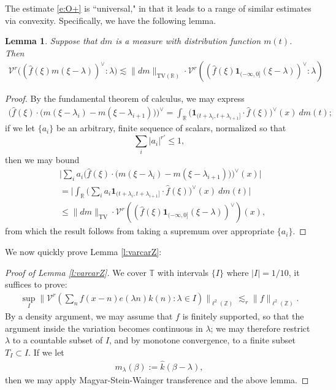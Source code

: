 \documentclass[12pt]{amsart}
\numberwithin{equation}{section}
\newtheorem{lemma}[theorem]{Lemma}
\theoremstyle{definition}
\begin{document}
The estimate \eqref{e:O+} is ``universal," in that it leads to a range of similar estimates via convexity. Specifically, we have the following lemma.
\begin{lemma}\label{l:varcar}
    Suppose that $dm$ is a measure with distribution function $m(t)$. Then
    \begin{align}
        \mathcal{V}^r\big((\widehat{f}(\xi) m(\xi - \lambda) )^{\vee} : \lambda \big) \lesssim \| dm \|_{\text{TV}(\mathbb{R})} \cdot
        \mathcal{V}^r( (\widehat{f}(\xi) \mathbf{1}_{(-\infty,0]}(\xi - \lambda) )^{\vee} : \lambda) 
    \end{align}
\end{lemma}
\begin{proof}
By the fundamental theorem of calculus, we may express
\begin{align}
    \Big( \widehat{f}(\xi) \cdot \big( m(\xi - \lambda_i)  - m(\xi - \lambda_{i+1}) \big) \Big)^{\vee} = \int_{\mathbb{R}} \big( \mathbf{1}_{(t+\lambda_i,t+\lambda_{i+1}]} \cdot \widehat{f}(\xi) \big)^{\vee}(x)  \ dm(t);
\end{align}
if we let $\{ a_i \}$ be an arbitrary, finite sequence of scalars, normalized so that 
\[ \sum_i |a_i|^{r'} \leq 1,\]
then we may bound
\begin{align}
    &\Big| \sum_i a_i \Big( \widehat{f}(\xi) \cdot \big( m(\xi - \lambda_i)  - m(\xi - \lambda_{i+1}) \big) \Big)^{\vee}(x) \Big| \\
    & = \Big| \int_{\mathbb{R}} \big( \sum_i a_i \mathbf{1}_{(t+\lambda_i,t+\lambda_{i+1}]} \cdot \widehat{f}(\xi) \big)^{\vee}(x)  \ dm(t) \Big|\\
    & \leq \| dm \|_{\text{TV}} \cdot \mathcal{V}^r( (\widehat{f}(\xi) \mathbf{1}_{(-\infty,0]}(\xi - \lambda) )^{\vee})(x),
\end{align}
from which the result follows from taking a supremum over appropriate $\{a_i\}$.
\end{proof}
We now quickly prove Lemma \ref{l:varcarZ}:
\begin{proof}[Proof of Lemma \ref{l:varcarZ}]
We cover $\mathbb{T}$ with intervals $\{ I \}$ where $|I| = 1/10$, it suffices to prove:
\begin{align}
          \sup_I  \| \mathcal{V}^r( \sum_{n} f(x-n) e(\lambda n) k(n) : \lambda \in I) \|_{\ell^2(\mathbb{Z})} \lesssim_r \|f \|_{\ell^2(\mathbb{Z})}.
\end{align}
By a density argument, we may assume that $f$ is finitely supported, so that the argument inside the variation becomes continuous in $\lambda$; we may therefore restrict $\lambda$ to a countable subset of $I$, and by monotone convergence, to a finite subset $T_I \subset I$. If we let
\begin{align}
    m_\lambda(\beta) := \widehat{k}(\beta -\lambda),
\end{align}
then we may apply Magyar-Stein-Wainger transference \cite{MSW} and the above lemma. 
\end{proof}
\end{document}
